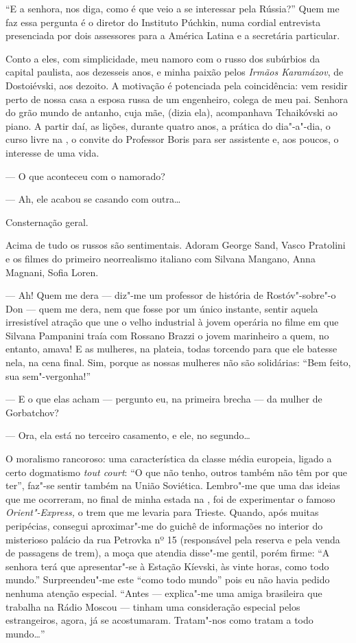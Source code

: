 ``E a senhora, nos diga, como é que veio a se interessar pela Rússia?''
Quem me faz essa pergunta é o diretor do Instituto Púchkin, numa cordial
entrevista presenciada por dois assessores para a América Latina e a
secretária particular.

Conto a eles, com simplicidade, meu namoro com o russo dos subúrbios da
capital paulista, aos dezesseis anos, e minha paixão pelos \emph{Irmãos
Karamázov}, de Dostoiévski, aos dezoito. A motivação é potenciada pela
coincidência: vem residir perto de nossa casa a esposa russa de um
engenheiro, colega de meu pai. Senhora do grão mundo de antanho, cuja
mãe, (dizia ela), acompanhava Tchaikóvski ao piano. A partir daí, as
lições, durante quatro anos, a prática do dia"-a"-dia, o curso livre na
, o convite do Professor Boris para ser assistente e, aos poucos, o
interesse de uma vida.

--- O que aconteceu com o namorado?

--- Ah, ele acabou se casando com outra\ldots{}

Consternação geral.

Acima de tudo os russos são sentimentais. Adoram George Sand, Vasco
Pratolini e os filmes do primeiro neorrealismo italiano com Silvana
Mangano, Anna Magnani, Sofia Loren.

--- Ah! Quem me dera --- diz"-me um professor de história de Rostóv"-sobre"-o
Don --- quem me dera, nem que fosse por um único instante, sentir aquela
irresistível atração que une o velho industrial à jovem operária no
filme em que Silvana Pampanini traía com Rossano Brazzi o jovem
marinheiro a quem, no entanto, amava! E as mulheres, na plateia, todas
torcendo para que ele batesse nela, na cena final. Sim, porque as nossas
mulheres não são solidárias: ``Bem feito, sua sem"-vergonha!''

--- E o que elas acham --- pergunto eu, na primeira brecha --- da mulher de
Gorbatchov?

--- Ora, ela está no terceiro casamento, e ele, no segundo\ldots{}

O moralismo rancoroso: uma característica da classe média europeia,
ligado a certo dogmatismo \emph{tout court}: ``O que não tenho, outros
também não têm por que ter'', faz"-se sentir também na União Soviética.
Lembro"-me que uma das ideias que me ocorreram, no final de minha estada
na , foi de experimentar o famoso \emph{Orient"-Express,} o trem que
me levaria para Trieste. Quando, após muitas peripécias, consegui
aproximar"-me do guichê de informações no interior do misterioso palácio
da rua Petrovka nº 15 (responsável pela reserva e pela venda de
passagens de trem), a moça que atendia disse"-me gentil, porém firme: ``A
senhora terá que apresentar"-se à Estação Kíevski, às vinte horas, como
todo mundo.'' Surpreendeu"-me este ``como todo mundo'' pois eu não havia
pedido nenhuma atenção especial. ``Antes --- explica"-me uma amiga
brasileira que trabalha na Rádio Moscou --- tinham uma consideração
especial pelos estrangeiros, agora, já se acostumaram. Tratam"-nos como
tratam a todo mundo\ldots{}''

